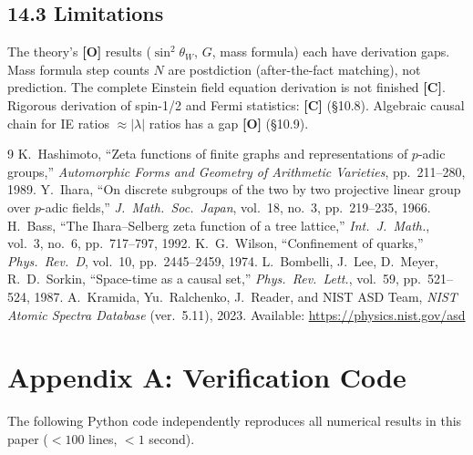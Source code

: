 \documentclass[11pt,a4paper]{article}
\newcommand{\gradeO}{\textbf{[O]}}
\newcommand{\gradeC}{\textbf{[C]}}
\begin{document}
\subsection{14.3 Limitations}

The theory's \gradeO{} results ($\sin^2\theta_W$, $G$, mass formula) each have derivation gaps. Mass formula step counts $N$ are postdiction (after-the-fact matching), not prediction. The complete Einstein field equation derivation is not finished \gradeC. Rigorous derivation of spin-1/2 and Fermi statistics: \gradeC{} (\S10.8). Algebraic causal chain for IE ratios $\approx |\lambda|$ ratios has a gap \gradeO{} (\S10.9).

\begin{thebibliography}{9}
 K.~Hashimoto, ``Zeta functions of finite graphs and representations of $p$-adic groups,'' \emph{Automorphic Forms and Geometry of Arithmetic Varieties}, pp.~211--280, 1989.
 Y.~Ihara, ``On discrete subgroups of the two by two projective linear group over $p$-adic fields,'' \emph{J.~Math.\ Soc.\ Japan}, vol.~18, no.~3, pp.~219--235, 1966.
 H.~Bass, ``The Ihara--Selberg zeta function of a tree lattice,'' \emph{Int.\ J.\ Math.}, vol.~3, no.~6, pp.~717--797, 1992.
 K.~G.~Wilson, ``Confinement of quarks,'' \emph{Phys.\ Rev.\ D}, vol.~10, pp.~2445--2459, 1974.
 L.~Bombelli, J.~Lee, D.~Meyer, R.~D.~Sorkin, ``Space-time as a causal set,'' \emph{Phys.\ Rev.\ Lett.}, vol.~59, pp.~521--524, 1987.
 A.~Kramida, Yu.~Ralchenko, J.~Reader, and NIST ASD Team, \emph{NIST Atomic Spectra Database} (ver.~5.11), 2023. Available: \url{https://physics.nist.gov/asd}
\end{thebibliography}

\appendix
\section{Appendix A: Verification Code}\label{app:code}

The following Python code independently reproduces all numerical results in this paper ($<100$ lines, $<1$ second).
\end{document}
